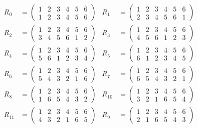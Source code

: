 \documentclass[twoside]{amsart}
\begin{document}
\begin{enumerate}[A.]
\begin{enumerate}[1]
      \begin{align*}
	 R_0 & = \begin{pmatrix}
		   1 & 2 & 3 & 4 & 5 & 6 \\
		   1 & 2 & 3 & 4 & 5 & 6
		 \end{pmatrix}
		 &
	 R_1 & = \begin{pmatrix}
		   1 & 2 & 3 & 4 & 5 & 6 \\
		   2 & 3 & 4 & 5 & 6 & 1
		 \end{pmatrix} \\
	 R_2 & = \begin{pmatrix}
		   1 & 2 & 3 & 4 & 5 & 6 \\
		   3 & 4 & 5 & 6 & 1 & 2
		 \end{pmatrix}
		 &
	 R_3 & = \begin{pmatrix}
		   1 & 2 & 3 & 4 & 5 & 6 \\
		   4 & 5 & 6 & 1 & 2 & 3
		 \end{pmatrix} \\
	 R_4 & = \begin{pmatrix}
		   1 & 2 & 3 & 4 & 5 & 6 \\
		   5 & 6 & 1 & 2 & 3 & 4
		 \end{pmatrix}
		 &
	 R_5 & = \begin{pmatrix}
		   1 & 2 & 3 & 4 & 5 & 6 \\
		   6 & 1 & 2 & 3 & 4 & 5
		 \end{pmatrix} \\
	 R_6 & = \begin{pmatrix}
		   1 & 2 & 3 & 4 & 5 & 6 \\
		   5 & 4 & 3 & 2 & 1 & 6
		 \end{pmatrix}
		 &
	 R_7 & = \begin{pmatrix}
		   1 & 2 & 3 & 4 & 5 & 6 \\
		   6 & 5 & 4 & 3 & 2 & 1
		 \end{pmatrix} \\
	 R_8 & = \begin{pmatrix}
		   1 & 2 & 3 & 4 & 5 & 6 \\
		   1 & 6 & 5 & 4 & 3 & 2
		 \end{pmatrix}
		 &
	 R_{10} & = \begin{pmatrix}
		   1 & 2 & 3 & 4 & 5 & 6 \\
		   3 & 2 & 1 & 6 & 5 & 4
		 \end{pmatrix} \\
	 R_{11} & = \begin{pmatrix}
		   1 & 2 & 3 & 4 & 5 & 6 \\
		   4 & 3 & 2 & 1 & 6 & 5
		 \end{pmatrix}
		 &
	 R_9 & = \begin{pmatrix}
		   1 & 2 & 3 & 4 & 5 & 6 \\
		   2 & 1 & 6 & 5 & 4 & 3
		 \end{pmatrix}
      \end{align*}


\end{enumerate}
\end{enumerate}
\end{document}
